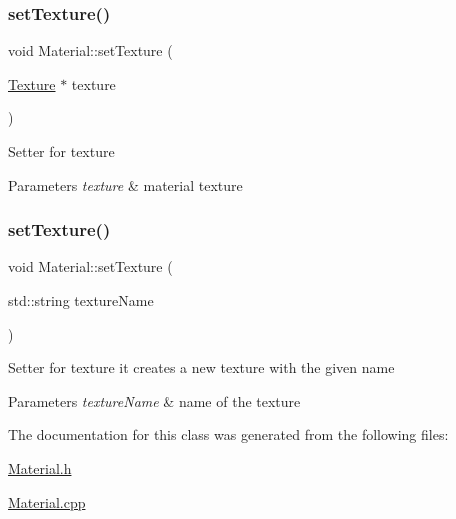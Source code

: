 \subsubsection{\texorpdfstring{set\+Texture()}{setTexture()}\hspace{0.1cm}{\footnotesize\ttfamily [1/2]}}
{\footnotesize\ttfamily void Material\+::set\+Texture (\begin{DoxyParamCaption}\item[{\hyperlink{classTexture}{Texture} $\ast$}]{texture }\end{DoxyParamCaption})}

Setter for texture 
\begin{DoxyParams}{Parameters}
{\em texture} & material texture \\
\hline
\end{DoxyParams}
\mbox{\label{classMaterial_a4f41c753bbd579a4bcbb1d46f085ad3f}} 
\subsubsection{\texorpdfstring{set\+Texture()}{setTexture()}\hspace{0.1cm}{\footnotesize\ttfamily [2/2]}}
{\footnotesize\ttfamily void Material\+::set\+Texture (\begin{DoxyParamCaption}\item[{std\+::string}]{texture\+Name }\end{DoxyParamCaption})}

Setter for texture it creates a new texture with the given name 
\begin{DoxyParams}{Parameters}
{\em texture\+Name} & name of the texture \\
\hline
\end{DoxyParams}


The documentation for this class was generated from the following files\+:\begin{DoxyCompactItemize}
\item 
\hyperlink{Material_8h}{Material.\+h}\item 
\hyperlink{Material_8cpp}{Material.\+cpp}\end{DoxyCompactItemize}
